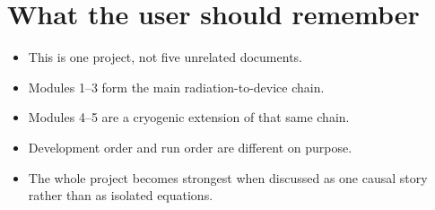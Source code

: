 \documentclass[11pt]{article}
\begin{document}
\section{What the user should remember}
\begin{itemize}
    \item This is one project, not five unrelated documents.
    \item Modules 1--3 form the main radiation-to-device chain.
    \item Modules 4--5 are a cryogenic extension of that same chain.
    \item Development order and run order are different on purpose.
    \item The whole project becomes strongest when discussed as one causal story rather than as isolated equations.
\end{itemize}
\end{document}
